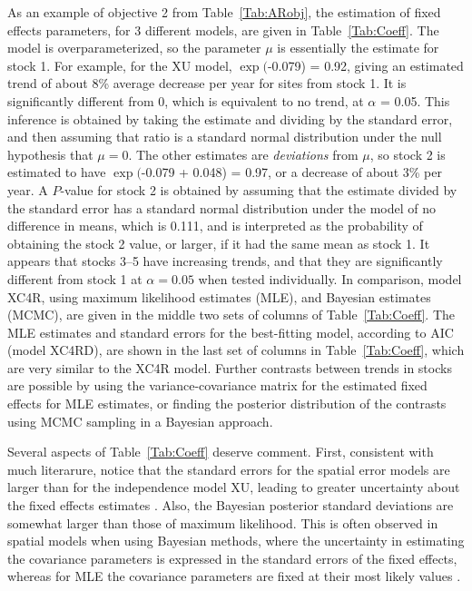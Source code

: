 \documentclass[11pt, titlepage]{article}\usepackage[]{graphicx}\usepackage[]{color}
\begin{document}
\begin{spacing}{1.9}
\begin{flushleft}
As an example of objective 2 from Table~\ref{Tab:ARobj}, the estimation of fixed effects parameters, for 3 different models, are given in Table~\ref{Tab:Coeff}.  The model is overparameterized, so the parameter $\mu$ is essentially the estimate for stock 1. For example, for the XU model, $\exp($-0.079) = 0.92, giving an estimated trend of about 8\% average decrease per year for sites from stock 1. It is significantly different from 0, which is equivalent to no trend, at $\alpha$ = 0.05. This inference is obtained by taking the estimate and dividing by the standard error, and then assuming that ratio is a standard normal distribution under the null hypothesis that $\mu = 0$. The other estimates are \emph{deviations} from $\mu$, so stock 2 is estimated to have $\exp($-0.079 + 0.048) = 0.97, or a decrease of about 3\% per year.  A $P$-value for stock 2 is obtained by assuming that the estimate divided by the standard error has a standard normal distribution under the model of no difference in means, which is 0.111, and is interpreted as the probability of obtaining the stock 2 value, or larger, if it had the same mean as stock 1.  It appears that stocks 3--5 have increasing trends, and that they are significantly different from stock 1 at $\alpha = 0.05$ when tested individually.  In comparison, model XC4R, using maximum likelihood estimates (MLE), and Bayesian estimates (MCMC), are given in the middle two sets of columns of Table~\ref{Tab:Coeff}. The MLE estimates and standard errors for the best-fitting model, according to AIC (model XC4RD), are shown in the last set of columns in Table~\ref{Tab:Coeff}, which are very similar to the XC4R model.  Further contrasts between trends in stocks are possible by using the variance-covariance matrix for the estimated fixed effects for MLE estimates, or finding the posterior distribution of the contrasts using MCMC sampling in a Bayesian approach.

Several aspects of Table~\ref{Tab:Coeff} deserve comment. First, consistent with much literarure, notice that the standard errors for the spatial error models are larger than for the independence model XU, leading to greater uncertainty about the fixed effects estimates \citep{Clif:Ord:spat:1981, Anse:Grif:spat:1988,Lege:spat:1993,Lenn:red:2000,Ver:Cres:Fish:Case:unce:2001,Fort:Paye:test:2002}.  Also, the Bayesian posterior standard deviations are somewhat larger than those of maximum likelihood.  This is often observed in spatial models when using Bayesian methods, where the uncertainty in estimating the covariance parameters is expressed in the standard errors of the fixed effects, whereas for MLE the covariance parameters are fixed at their most likely values \citep{Hand:Stei:baye:1993}.


\end{flushleft}
\end{spacing}
\end{document}
